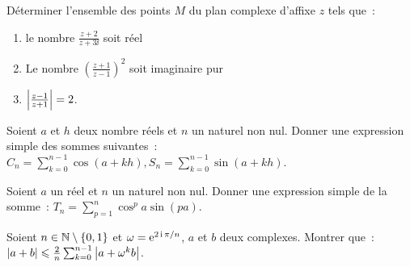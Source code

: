                                 \begin{exercice}
                                  Déterminer l'ensemble des points \(M\) du plan complexe d'affixe \(z\) tels 
                                  que~:
                                  \begin{enumerate}
                                    \item le nombre \(\frac{z + 2}{z + 3\ii}\) soit réel
                                    \item Le nombre \(\left( \frac{z + 1}{z-1} \right)^2\) soit imaginaire 
                                      pur
                                    \item \(\left\lvert\frac{z-1}{z + 1}\right\rvert = 2\).
                                  \end{enumerate}
                                \end{exercice}

                                \begin{exercice}
                                  Soient \(a\) et \(h\) deux nombre réels et \(n\) un naturel non nul. Donner 
                                  une expression simple des sommes suivantes~: \( C_n = \sum_{k = 0}^{n-1} 
                                  \cos(a + kh), S_n = \sum_{k = 0}^{n-1} \sin(a + kh)\).
                                \end{exercice}

                                \begin{exercice}
                                  Soient \(a\) un réel et \(n\) un naturel non nul. Donner une expression 
                                  simple de la somme~: \(T_n = \sum_{p = 1}^n \cos^p a \sin(pa)\).
                                \end{exercice}

                                \begin{exercice}
                                  Soient \(n \in \mathbb{N}\setminus\{0,1\}\) et \(\omega = \operatorname{e}^{2\operatorname{i}\pi/n}\), \(a\) et 
                                  \(b\) deux complexes. Montrer que~: \(\left\lvert a + b\right\rvert \leqslant \frac{2}{n} 
                                  \sum_{k = 0}^{n-1} \left\lvert a + \omega^k b\right\rvert\).
                                \end{exercice}

